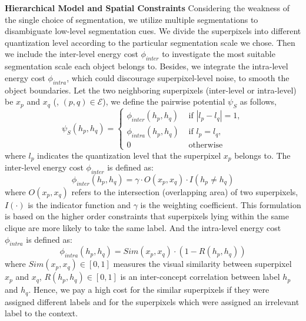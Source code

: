 \textbf{Hierarchical Model and Spatial Constraints}
Considering the weakness of the single choice of segmentation, we utilize multiple segmentations to disambiguate low-level segmentation cues. We divide the superpixels into different quantization level according to the particular segmentation scale we chose. Then we include the inter-level energy cost $\phi_{inter}$ to investigate the most suitable segmentation scale each object belongs to. Besides, we integrate the intra-level energy cost $\phi_{intra}$, which could discourage superpixel-level noise, to smooth the object boundaries. Let the two neighboring superpixels (inter-level or intra-level) be $x_p$ and $x_q$ (\ie, $(p,q) \in \mathcal{E}$), we define the pairwise potential $\psi_S$ as follows,
\begin{equation}
    \psi_{S}(h_p,h_q) =
    \begin{cases}
        \phi_{inter}(h_p,h_q) &\mbox{ if } | l_p - l_q | = 1,
        \\
        \phi_{intra}(h_p,h_q) &\mbox{ if } l_p = l_q,
        \\
        0 &\mbox{ otherwise }
    \end{cases}
\end{equation}
where $l_p$ indicates the quantization level that the superpixel $x_p$ belongs to.
The inter-level energy cost $\phi_{inter}$ is defined as:
\begin{equation}
    \phi_{inter}(h_p,h_q) = \gamma \cdot O(x_p,x_q) \cdot I(h_p \neq h_q)
\end{equation}
where $O(x_p,x_q)$ refers to the intersection (overlapping area) of two superpixels, $I(\cdot)$ is the indicator function and $\gamma$ is the weighting coefficient. This formulation is based on the higher order constraints \cite{kohli2009robust,ladicky2009associative} that superpixels lying within the same clique are more likely to take the same label.
And the intra-level energy cost $\phi_{intra}$ is defined as:
\begin{equation}
    \phi_{intra}(h_p,h_q) = Sim(x_p,x_q) \cdot (1-R(h_p,h_q))
\end{equation}
where $Sim(x_p,x_q) \in [0,1]$ measures the visual similarity between superpixel $x_p$ and $x_q$, $R(h_p,h_q) \in [0,1]$ is an inter-concept correlation between label $h_p$ and $h_q$. Hence, we pay a high cost for the similar superpixels if they were assigned different labels and for the superpixels which were assigned an irrelevant label to the context.

